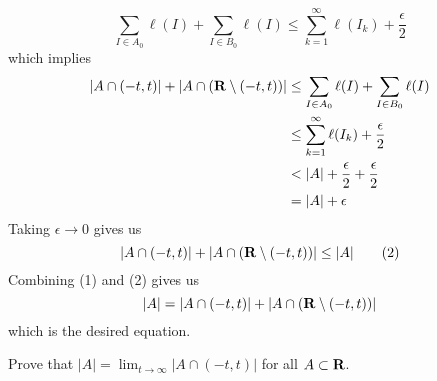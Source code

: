 \begin{solution}
    $$\sum_{I\in A_0}\ell(I) + \sum_{I\in B_0}\ell(I) \leq \sum_{k=1}^{\infty}\ell(I_k) + \frac{\epsilon}{2}$$
    which implies 
    \begin{align*}
        |A \cap (-t, t)| + |A \cap (\mathbf{R} \setminus (-t, t))| &\leq \sum_{I\in A_0}\ell(I) + \sum_{I\in B_0}\ell(I) \\
        &\leq \sum_{k=1}^{\infty}\ell(I_k) + \frac{\epsilon}{2} \\
        &< |A| + \frac{\epsilon}{2} + \frac{\epsilon}{2} \\
        &= |A| + \epsilon
    \end{align*}
    Taking $\epsilon \rightarrow 0$ gives us
    \[|A \cap (-t, t)| + |A \cap (\mathbf{R} \setminus (-t, t))| \leq |A| \tag*{(2)}\]
    Combining (1) and (2) gives us
    $$|A| = |A \cap (-t, t)| + |A \cap (\mathbf{R} \setminus (-t, t))|$$
    which is the desired equation. \\
\end{solution}

\begin{exercise}
    Prove that $|A| = \displaystyle \lim_{t \rightarrow \infty}|A \cap (-t, t)|$ for all $A \subset \mathbf{R}$. \\
\end{exercise}

